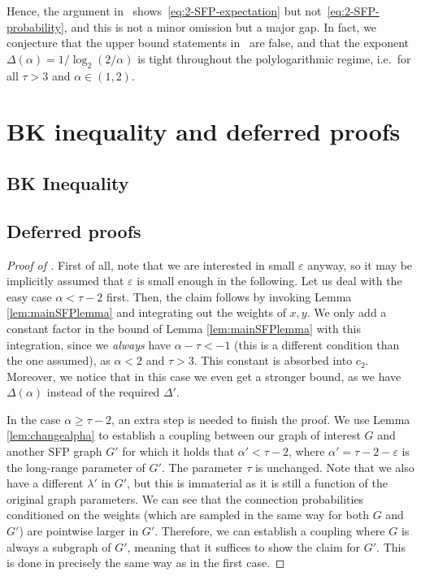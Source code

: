 \documentclass[11pt, letterpaper, margin=1in]{amsart}
\theoremstyle{definition}
\theoremstyle{remark}
\newcommand{\eps}{\varepsilon}
\newcommand{\percparam}{\lambda}
\newcommand{\alphaparam}{\alpha}
\newcommand{\tauparam}{\tau}
\newcommand{\Cconst}{c_2}
\numberwithin{equation}{section}
\begin{document}
Hence, the argument in~\cite{hao2023graph} shows~\eqref{eq:2-SFP-expectation} but not~\eqref{eq:2-SFP-probability}, and this is not a minor omission but a major gap. In fact, we conjecture that the upper bound statements in~\cite{hao2023graph} are false, and that the exponent $\Delta(\alpha)= 1/\log_2(2/\alpha)$ is tight throughout the polylogarithmic regime, i.e.\ for all $\tau >3$ and $\alpha \in (1,2)$.

\section{BK inequality and deferred proofs}\label{sec:BK_inequality_and_proofs}

\subsection{BK Inequality}


\subsection{Deferred proofs}

\mainSFPlowerboundTheorem*
\begin{proof}[Proof of ]
First of all, note that we are interested in small $\eps$ anyway, so it may be implicitly assumed that $\eps$ is small enough in the following. Let us deal with the easy case $\alphaparam < \tauparam - 2$ first. Then, the claim follows by invoking Lemma \ref{lem:mainSFPlemma} and integrating out the weights of $x, y$. We only add a constant factor in the bound of Lemma \ref{lem:mainSFPlemma} with this integration, since we \emph{always} have $\alphaparam - \tauparam < -1$ (this is a different condition than the one assumed), as $\alphaparam < 2$ and $\tauparam > 3$. This constant is absorbed into $\Cconst{}$. Moreover, we notice that in this case we even get a stronger bound, as we have $\Delta(\alphaparam)$ instead of the required $\Delta'$. 

In the case $\alphaparam \ge \tauparam - 2$, an extra step is needed to finish the proof. We use Lemma \ref{lem:changealpha} to establish a coupling between our graph of interest $G$ and another SFP graph $G'$ for which it holds that $\alphaparam' < \tauparam - 2$, where $\alphaparam' = \tau - 2 - \eps$ is the long-range parameter of $G'$. The parameter $\tauparam$ is unchanged. Note that we also have a different $\percparam'$ in $G'$, but this is immaterial as it is still a function of the original graph parameters. We can see that the connection probabilities conditioned on the weights (which are sampled in the same way for both $G$ and $G'$) are pointwise larger in $G'$. Therefore, we can establish a coupling where $G$ is always a subgraph of $G'$, meaning that it suffices to show the claim for $G'$. This is done in precisely the same way as in the first case.
\end{proof}
\end{document}
